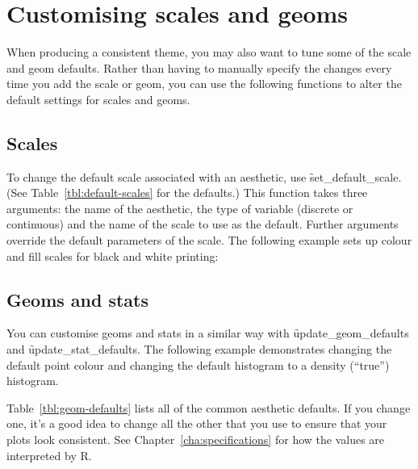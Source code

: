 \section{Customising scales and geoms}
\label{sec:theme-scale-geom}

When producing a consistent theme, you may also want to tune some of the scale and geom defaults.  Rather than having to manually specify the changes every time you add the scale or geom, you can use the following functions to alter the default settings for scales and geoms.

\subsection{Scales}
\label{sub:customise-scales}

To change the default scale associated with an aesthetic, use \f{set_default_scale}. (See Table~\ref{tbl:default-scales} for the defaults.)  This function takes three arguments: the name of the aesthetic, the type of variable (discrete or continuous) and the name of the scale to use as the default.  Further arguments override the default parameters of the scale.  The following example sets up colour and fill scales for black and white printing:

% 


\subsection{Geoms and stats}
\label{sub:geoms_and_stats}

You can customise geoms and stats in a similar way with \f{update_geom_defaults} and \f{update_stat_defaults}.  The following example demonstrates changing the default point colour and changing the default histogram to a density (``true'') histogram.

Table~\ref{tbl:geom-defaults} lists all of the common aesthetic defaults.  If you change one, it's a good idea to change all the other that you use to ensure that your plots look consistent.  See Chapter~\ref{cha:specifications} for how the values are interpreted by R.

% 

